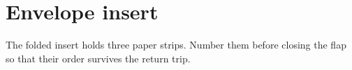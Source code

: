 \documentclass[11pt,letterpaper]{article}
\begin{document}
\section*{Envelope insert}
The folded insert holds three paper strips. Number them before closing the flap so that their order survives the return trip.
\end{document}
